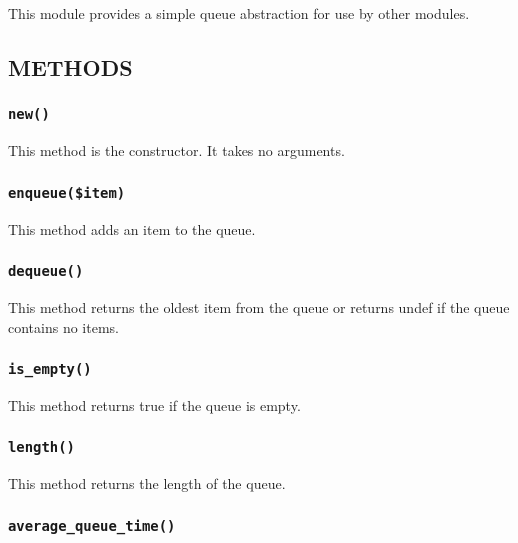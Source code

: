 \documentclass[12pt,a4paper]{article}
\begin{document}
This module provides a simple queue abstraction for use by other modules.

\subsection*{METHODS\label{xPL::Queue_METHODS}}
\subsubsection*{\texttt{new()}\label{xPL::Queue_new_}}


This method is the constructor.  It takes no arguments.

\subsubsection*{\texttt{enqueue(\$item)}\label{xPL::Queue_enqueue_item_}}


This method adds an item to the queue.

\subsubsection*{\texttt{dequeue()}\label{xPL::Queue_dequeue_}}


This method returns the oldest item from the queue or returns undef if
the queue contains no items.

\subsubsection*{\texttt{is\_empty()}\label{xPL::Queue_is_empty_}}


This method returns true if the queue is empty.

\subsubsection*{\texttt{length()}\label{xPL::Queue_length_}}


This method returns the length of the queue.

\subsubsection*{\texttt{average\_queue\_time()}\label{xPL::Queue_average_queue_time_}}
\end{document}
